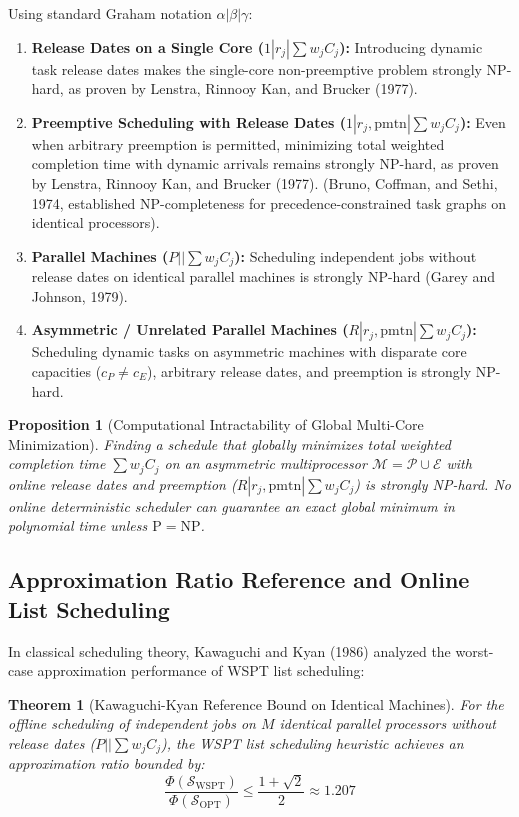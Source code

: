 \documentclass[conference]{IEEEtran}
\newtheorem{theorem}{Theorem}
\newtheorem{proposition}{Proposition}
\begin{document}
Using standard Graham notation $\alpha | \beta | \gamma$:
\begin{enumerate}
    \item \textbf{Release Dates on a Single Core ($1 | r_j | \sum w_j C_j$):} Introducing dynamic task release dates makes the single-core non-preemptive problem strongly NP-hard, as proven by Lenstra, Rinnooy Kan, and Brucker (1977).
    \item \textbf{Preemptive Scheduling with Release Dates ($1 | r_j, \text{pmtn} | \sum w_j C_j$):} Even when arbitrary preemption is permitted, minimizing total weighted completion time with dynamic arrivals remains strongly NP-hard, as proven by Lenstra, Rinnooy Kan, and Brucker (1977). (Bruno, Coffman, and Sethi, 1974, established NP-completeness for precedence-constrained task graphs on identical processors).
    \item \textbf{Parallel Machines ($P || \sum w_j C_j$):} Scheduling independent jobs without release dates on identical parallel machines is strongly NP-hard (Garey and Johnson, 1979).
    \item \textbf{Asymmetric / Unrelated Parallel Machines ($R | r_j, \text{pmtn} | \sum w_j C_j$):} Scheduling dynamic tasks on asymmetric machines with disparate core capacities ($c_P \ne c_E$), arbitrary release dates, and preemption is strongly NP-hard.
\end{enumerate}

\begin{proposition}[Computational Intractability of Global Multi-Core Minimization]
\label{prop:np_hard}
Finding a schedule that globally minimizes total weighted completion time $\sum w_j C_j$ on an asymmetric multiprocessor $\mathcal{M} = \mathcal{P} \cup \mathcal{E}$ with online release dates and preemption ($R | r_j, \text{pmtn} | \sum w_j C_j$) is strongly NP-hard. No online deterministic scheduler can guarantee an exact global minimum in polynomial time unless $\mathrm{P} = \mathrm{NP}$.
\end{proposition}

\subsection{Approximation Ratio Reference and Online List Scheduling}
In classical scheduling theory, Kawaguchi and Kyan (1986) analyzed the worst-case approximation performance of WSPT list scheduling:
\begin{theorem}[Kawaguchi-Kyan Reference Bound on Identical Machines]
\label{thm:kawaguchi_kyan}
For the offline scheduling of independent jobs on $M$ identical parallel processors without release dates ($P || \sum w_j C_j$), the WSPT list scheduling heuristic achieves an approximation ratio bounded by:
\begin{equation}
\frac{\Phi(\mathcal{S}_{\mathrm{WSPT}})}{\Phi(\mathcal{S}_{\mathrm{OPT}})} \le \frac{1 + \sqrt{2}}{2} \approx 1.207
\end{equation}
\end{theorem}
\end{document}
